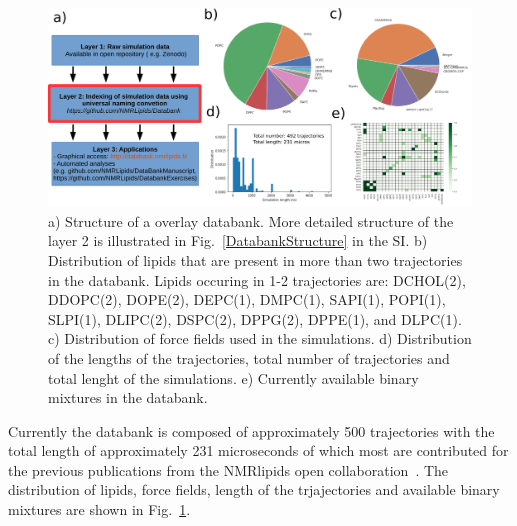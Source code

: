 \documentclass[fleqn,10pt]{wlscirep}
\begin{document}
\begin{figure}
    \centering
    \includegraphics[width = 180mm]{Figures/overlay.pdf}
    \caption{a) Structure of a overlay databank. 
    More detailed structure of the layer 2 is illustrated in Fig.~\ref{DatabankStructure} in the SI.
    b) Distribution of lipids that are present in more than two trajectories in the databank.
    Lipids occuring in 1-2 trajectories are: DCHOL(2), DDOPC(2), DOPE(2), DEPC(1), DMPC(1), SAPI(1), POPI(1), SLPI(1), DLIPC(2), DSPC(2), DPPG(2), DPPE(1), and DLPC(1).
    c) Distribution of force fields used in the simulations.
    d) Distribution of the lengths of the trajectories, total number of trajectories and total lenght of the simulations.
    e) Currently available binary mixtures in the databank.}
    \label{fig:overlay}
\end{figure}

Currently the databank is composed of approximately 500 trajectories with the total length of approximately 231 microseconds of which most are contributed for the previous publications from the NMRlipids open collaboration~\cite{botan15,catte16,antila19,bacle21}. The distribution of lipids, force fields, length of the trjajectories and available binary mixtures are shown in Fig.~\ref{fig:overlay}. 
\end{document}
